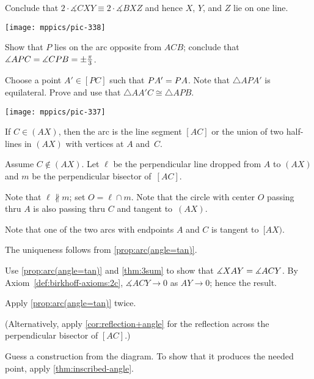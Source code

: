 \begin{multicols}{2}
Conclude that 
$2\cdot \measuredangle CXY\equiv 2\cdot \measuredangle BXZ$
and hence $X$, $Y$, and $Z$ lie on one line.

\begin{Figure}
\centering
\texttt{[image: mppics/pic-338]}
\end{Figure}



Show that $P$ lies on the arc opposite from $ACB$;
conclude that
$\measuredangle APC\z=\measuredangle CPB\z=\pm\tfrac\pi3$.

Choose a point $A'\in [PC]$ such that $PA'\z=PA$.
Note that $\triangle APA'$ is equilateral.
Prove and use that $\triangle AA'C\cong \triangle APB$.

\begin{Figure}
\centering
\texttt{[image: mppics/pic-337]}
\end{Figure}

If $C\in (AX)$, then the arc is the line segment $[AC]$ or the union of two half-lines in $(AX)$ with vertices at $A$ and~$C$.

Assume $C\notin (AX)$.
Let $\ell$ be the perpendicular line dropped from $A$ to $(AX)$ and $m$ be the perpendicular bisector of~$[AC]$.

Note that $\ell\nparallel m$;
set $O=\ell\cap m$.
Note that the circle with center $O$ passing thru $A$ is also passing thru $C$ and tangent to~$(AX)$.


Note that one of the two arcs with endpoints $A$ and $C$ is tangent to~$[AX)$.

The uniqueness follows from \ref{prop:arc(angle=tan)}.

 Use \ref{prop:arc(angle=tan)} and \ref{thm:3sum} to show that 
$\measuredangle XAY\z=\measuredangle ACY$.
By Axiom~\ref{def:birkhoff-axioms:2c}, $\measuredangle ACY\to 0$ as $AY\to 0$;
hence the result.

Apply \ref{prop:arc(angle=tan)} twice.

(Alternatively, apply \ref{cor:reflection+angle} for the reflection across the perpendicular bisector of $[AC]$.)

 Guess a construction from the diagram.
To show that it produces the needed point, apply \ref{thm:inscribed-angle}.


\end{multicols}
